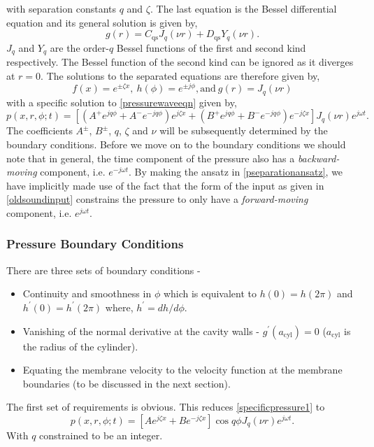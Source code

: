 with separation constants $q$ and $\zeta$. The last equation is the Bessel differential equation \cite[p.~313]{copsonbessel} and its general solution is given by,
\begin{equation}
 g(r)=C_{\mathrm{qs}}J_q(\nu r)+D_{\mathrm{qs}}Y_q(\nu r).
\end{equation}
$J_q$ and $Y_q$ are the order-$q$ Bessel functions of the first and second kind respectively. The Bessel function of the second kind can be ignored as it diverges at $r=0$.
The solutions to the separated equations are therefore given by,
\begin{equation}
 f(x)=e^{\pm \zeta x},\ h(\phi)=e^{\pm j\phi},\text{and}\ g(r)=J_q(\nu r)
\end{equation}
with a specific solution to \eqref{pressurewaveeqn} given by,
\begin{equation}\label{specificpressure1}
 p(x,r,\phi;t)=\left[(A^+e^{jq\phi}+A^-e^{-jq\phi})e^{j\zeta x}+(B^+e^{jq\phi}+B^-e^{-jq\phi})e^{-j\zeta x}\right]J_q(\nu r)e^{j\omega t}.
\end{equation}
The coefficients $A^\pm$, $B^\pm$, $q$, $\zeta$ and $\nu$ will be subsequently determined by the boundary conditions. 
Before we move on to the boundary conditions we should note that in general, the time component of the pressure also has a \textit{backward-moving} component, i.e. $e^{-j\omega t}$. 
By making the ansatz in \eqref{pseparationansatz}, we have implicitly made use of the fact that the form of the input as given in \eqref{oldsoundinput} constrains the pressure to only have a \textit{forward-moving} component, i.e. $e^{j\omega t}$.  
\subsubsection{Pressure Boundary Conditions}\label{pressureboundaryconditions}
There are three sets of boundary conditions - 
\begin{itemize}
 \item Continuity and smoothness in $\phi$ which is equivalent to $h(0)=h(2\pi)$ and $h^\prime(0)=h^\prime(2\pi)$ where, $h^\prime=dh/d\phi$.
 \item Vanishing of the normal derivative at the cavity walls - $g^\prime(a_{\mathrm{cyl}})=0$ ($a_{\mathrm{cyl}}$ is the radius of the cylinder).
 \item Equating the membrane velocity to the velocity function at the membrane boundaries (to be discussed in the next section).
\end{itemize}
The first set of requirements is obvious. This reduces \eqref{specificpressure1} to 
\begin{equation}\label{specificpressure2}
 p(x,r,\phi;t)=\left[Ae^{j\zeta x}+Be^{-j\zeta x}\right]\cos q\phi J_q(\nu r)e^{j\omega t}.
\end{equation}
With $q$ constrained to be an integer.

